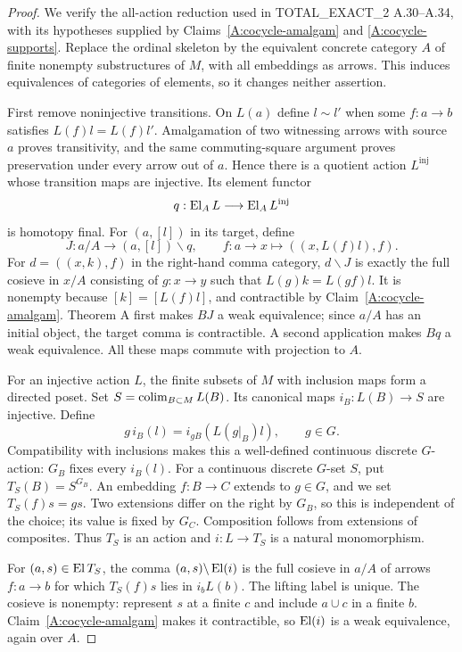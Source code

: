 \begin{proof}
We verify the all-action reduction used in TOTAL\_EXACT\_2 A.30--A.34, with its hypotheses supplied by Claims~\ref{A:cocycle-amalgam} and \ref{A:cocycle-supports}. Replace the ordinal skeleton by the equivalent concrete category $A$ of finite nonempty substructures of $M$, with all embeddings as arrows. This induces equivalences of categories of elements, so it changes neither assertion.

First remove noninjective transitions. On $L(a)$ define $l\sim l'$ when some $f:a\to b$ satisfies $L(f)l=L(f)l'$. Amalgamation of two witnessing arrows with source $a$ proves transitivity, and the same commuting-square argument proves preservation under every arrow out of $a$. Hence there is a quotient action $L^{\mathrm{inj}}$ whose transition maps are injective. Its element functor
\[
 q:\operatorname{El}_A L\longrightarrow\operatorname{El}_A L^{\mathrm{inj}}
\]
is homotopy final. For $(a,[l])$ in its target, define
\[
 J:a/A\longrightarrow (a,[l])\backslash q,
 \qquad f:a\to x\longmapsto ((x,L(f)l),f).
\]
For $d=((x,k),f)$ in the right-hand comma category, $d\backslash J$ is exactly the full cosieve in $x/A$ consisting of $g:x\to y$ such that $L(g)k=L(gf)l$. It is nonempty because $[k]=[L(f)l]$, and contractible by Claim~\ref{A:cocycle-amalgam}. Theorem A first makes $BJ$ a weak equivalence; since $a/A$ has an initial object, the target comma is contractible. A second application makes $Bq$ a weak equivalence. All these maps commute with projection to $A$.

For an injective action $L$, the finite subsets of $M$ with inclusion maps form a directed poset. Set $S=\operatorname*{colim}_{B\subset M}L(B)$. Its canonical maps $i_B:L(B)\to S$ are injective. Define
\[
 g\,i_B(l)=i_{gB}(L(g|_B)l),\qquad g\in G.
\]
Compatibility with inclusions makes this a well-defined continuous discrete $G$-action: $G_B$ fixes every $i_B(l)$. For a continuous discrete $G$-set $S$, put $T_S(B)=S^{G_B}$. An embedding $f:B\to C$ extends to $g\in G$, and we set $T_S(f)s=gs$. Two extensions differ on the right by $G_B$, so this is independent of the choice; its value is fixed by $G_C$. Composition follows from extensions of composites. Thus $T_S$ is an action and $i:L\to T_S$ is a natural monomorphism.

For $(a,s)\in\operatorname{El} T_S$, the comma $(a,s)\backslash\operatorname{El}(i)$ is the full cosieve in $a/A$ of arrows $f:a\to b$ for which $T_S(f)s$ lies in $i_bL(b)$. The lifting label is unique. The cosieve is nonempty: represent $s$ at a finite $c$ and include $a\cup c$ in a finite $b$. Claim~\ref{A:cocycle-amalgam} makes it contractible, so $\operatorname{El}(i)$ is a weak equivalence, again over $A$.


\end{proof}
